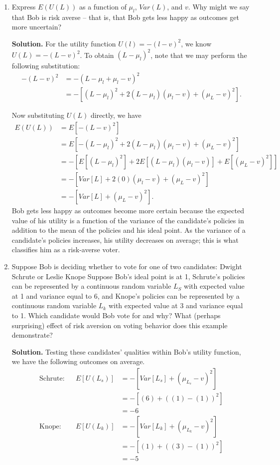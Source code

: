 \documentclass[12pt]{article}
\begin{document}
\begin{enumerate}
    \item Express $E(U(L))$ as a function of $\mu_l$, $Var(L)$, and $v$. Why might we say that Bob is risk averse – that is, that Bob gets less happy as outcomes get more uncertain?

\textbf{Solution.} For the utility function $U(l) = -(l - v)^2$, we know $U(L) = -(L - v)^2$. To obtain $(L -\mu_l)^2$, note that we may perform the following substitution:
\begin{align*}
    -(L - v)^2  &= -(L - \mu_l + \mu_l -v)^2
    \\ &= -[(L-\mu_l)^2 + 2(L-\mu_l)(\mu_l-v) + (\mu_L-v)^2].
\end{align*}

Now substituting $U(L)$ directly, we have
\begin{align*}
    E(U(L)) &= E[-(L-v)^2]
    \\ &= E\left[-(L-\mu_l)^2 + 2(L-\mu_l)(\mu_l-v) + (\mu_L-v)^2\right]
    \\ &= -\left[E[(L-\mu_l)^2] + 2E[(L-\mu_l)(\mu_l-v)] + E[(\mu_L-v)^2]\right]
    \\ &= -\left[Var[L] + 2(0)(\mu_l-v) + (\mu_L-v)^2\right]
    \\ &= -\left[Var[L] + (\mu_L-v)^2\right].
\end{align*}
Bob gets less happy as outcomes become more certain because the expected value of his utility is a function of the variance of the candidate's policies in addition to the mean of the policies and his ideal point. As the variance of a candidate's policies increases, his utility decreases on average; this is what classifies him as a risk-averse voter.

    \item Suppose Bob is deciding whether to vote for one of two candidates: Dwight Schrute or Leslie Knope Suppose Bob’s ideal point is at 1, Schrute’s policies can be represented by a continuous random variable $L_S$ with expected value at 1 and variance equal to 6, and Knope’s policies can be represented by a continuous random variable $L_k$ with expected value at 3 and variance equal to 1. Which candidate would Bob vote for and why? What (perhaps surprising) effect of risk aversion on voting behavior does this example demonstrate?

\textbf{Solution.} 
Testing these candidates' qualities within Bob's utility function, we have the following outcomes on average. 
\begin{align*}
    \text{Schrute:} && E[U(L_s)]&= -\left[Var[L_s] + (\mu_{L_s}-v)^2\right]
    \\ && &= -\left[(6) + ((1)-(1))^2\right]
    \\ && &= -6
    \\ \text{Knope:} && E[U(L_k)]&= -\left[Var[L_k] + (\mu_{L_k}-v)^2\right]
    \\ && &= -\left[(1) + ((3)-(1))^2\right]
    \\ && &= -5
\end{align*}


\end{enumerate}
\end{document}
